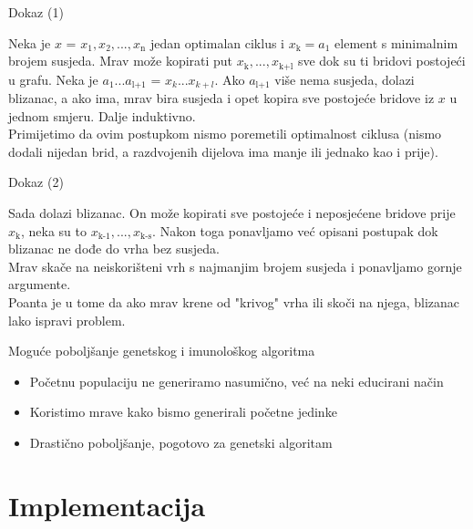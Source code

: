 \documentclass{beamer}
\begin{document}
\begin{frame}{Dokaz (1)}

Neka je $x$ = $x_{1}, x_{2},..., x_\text{n}$ jedan optimalan ciklus i $ x_\text{k} = a_{1}$ element s minimalnim brojem susjeda.
Mrav može kopirati put $x_\text{k},...,x_\text{k+l}$ sve dok su ti bridovi postojeći u grafu. Neka je $a_{1}...a_\text{l+1}$ = $x_{k}...x_{k+l}$. Ako $a_\text{l+1}$ više nema susjeda, dolazi blizanac, a ako ima, mrav bira susjeda i opet kopira sve postojeće bridove iz $x$ u jednom smjeru. Dalje induktivno. \\
Primijetimo da ovim postupkom nismo poremetili optimalnost ciklusa (nismo dodali nijedan brid, a razdvojenih dijelova ima manje ili jednako kao i prije).

\end{frame}

\begin{frame}{Dokaz (2)}

Sada dolazi blizanac. On može kopirati sve postojeće i neposjećene bridove prije $x_\text{k}$, neka su to $x_\text{k-1}, ..., x_\text{k-s}$. Nakon toga ponavljamo već opisani postupak dok blizanac ne dođe do vrha bez susjeda. \\
Mrav skače na neiskorišteni vrh s najmanjim brojem susjeda i ponavljamo gornje argumente. \\
Poanta je u tome da ako mrav krene od "krivog" vrha ili skoči na njega, blizanac lako ispravi problem.

\end{frame}

\begin{frame}{Moguće poboljšanje genetskog i imunološkog algoritma}

\begin{itemize}
\item Početnu populaciju ne generiramo nasumično, već na neki educirani način
\item Koristimo mrave kako bismo generirali početne jedinke
\item Drastično poboljšanje, pogotovo za genetski algoritam
 
\end{itemize}
\end{frame}

\section{Implementacija}
\end{document}
